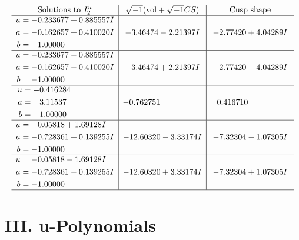 \documentclass[1p]{elsarticle_modified}
\theoremstyle{definition}
\newcommand{\I}{\sqrt{-1}}
\begin{document}
$$\begin{array}{c|c|c}  
\text{Solutions to }I^u_{2}& \I (\text{vol} + \sqrt{-1}CS) & \text{Cusp shape}\\
 \hline 
\begin{aligned}
u &= -0.233677 + 0.885557 I \\
a &= -0.162657 + 0.410020 I \\
b &= -1.00000\phantom{ +0.000000I}\end{aligned}
 & -3.46474 - 2.21397 I & -2.77420 + 4.04289 I \\ \hline\begin{aligned}
u &= -0.233677 - 0.885557 I \\
a &= -0.162657 - 0.410020 I \\
b &= -1.00000\phantom{ +0.000000I}\end{aligned}
 & -3.46474 + 2.21397 I & -2.77420 - 4.04289 I \\ \hline\begin{aligned}
u &= -0.416284\phantom{ +0.000000I} \\
a &= \phantom{-}3.11537\phantom{ +0.000000I} \\
b &= -1.00000\phantom{ +0.000000I}\end{aligned}
 & -0.762751\phantom{ +0.000000I} & \phantom{-}0.416710\phantom{ +0.000000I} \\ \hline\begin{aligned}
u &= -0.05818 + 1.69128 I \\
a &= -0.728361 + 0.139255 I \\
b &= -1.00000\phantom{ +0.000000I}\end{aligned}
 & -12.60320 - 3.33174 I & -7.32304 - 1.07305 I \\ \hline\begin{aligned}
u &= -0.05818 - 1.69128 I \\
a &= -0.728361 - 0.139255 I \\
b &= -1.00000\phantom{ +0.000000I}\end{aligned}
 & -12.60320 + 3.33174 I & -7.32304 + 1.07305 I\\
 \hline 
 \end{array}$$\newpage
\newpage\renewcommand{\arraystretch}{1}
\centering \section*{ III. u-Polynomials}
\end{document}
